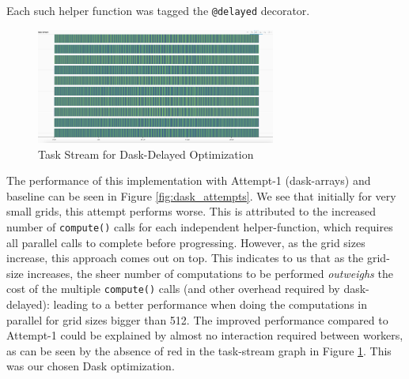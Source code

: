 \documentclass[a4paper,10pt]{article}
\begin{document}
Each such helper function was tagged the \verb|@delayed| decorator.
\begin{figure}[h]
  \centering
  \includegraphics[width=0.7\textwidth]{images/dask/dask_opt2.png}
  \caption{Task Stream for Dask-Delayed Optimization}
  \label{fig:dask_opt2_stream}
\end{figure}
The performance of this implementation with Attempt-1 (dask-arrays) and baseline can be seen in Figure \ref{fig:dask_attempts}.
We see that initially for very small grids, this attempt performs worse.
This is attributed to the increased number of \verb|compute()| calls for each independent helper-function, which requires all parallel calls to complete before progressing.
However, as the grid sizes increase, this approach comes out on top.
This indicates to us that as the grid-size increases, the sheer number of computations to be performed \emph{outweighs} the cost of the multiple \verb|compute()| calls (and other overhead required by dask-delayed): leading to a better performance when doing the computations in parallel for grid sizes bigger than 512.
The improved performance compared to Attempt-1 could be explained by almost no interaction required between workers, as can be seen by the absence of red in the task-stream graph in Figure \ref{fig:dask_opt2_stream}.
This was our chosen Dask optimization.
\end{document}
